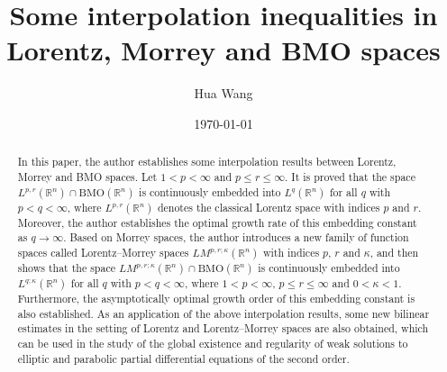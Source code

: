 \documentclass{birkjour}
\theoremstyle{definition}
\theoremstyle{remark}
\numberwithin{equation}{section}
\begin{document}
\title[Some interpolation inequalities]
{Some interpolation inequalities in Lorentz, Morrey and BMO spaces}
\author{Hua Wang}
\address{School of Mathematics and Systems Science,\\
Xinjiang University,\\
Urumqi 830046, P. R. China}




\date{\today}


\begin{abstract}
In this paper, the author establishes some interpolation results between Lorentz, Morrey and BMO spaces. Let $1<p<\infty$ and $p\leq r\leq\infty$. It is proved that the space $L^{p,r}(\mathbb R^n)\cap\mathrm{BMO}(\mathbb R^n)$ is continuously embedded into $L^q(\mathbb R^n)$ for all $q$ with $p<q<\infty$, where $L^{p,r}(\mathbb R^n)$ denotes the classical Lorentz space with indices $p$ and $r$. Moreover, the author establishes the optimal growth rate of this embedding constant as $q\to\infty$. Based on Morrey spaces, the author introduces a new family of function spaces called Lorentz--Morrey spaces $LM^{p,r;\kappa}(\mathbb R^n)$ with indices $p$, $r$ and $\kappa$, and then shows that the space $LM^{p,r;\kappa}(\mathbb R^n)\cap \mathrm{BMO}(\mathbb R^n)$ is continuously embedded into $L^{q;\kappa}(\mathbb R^n)$ for all $q$ with $p<q<\infty$, where $1<p<\infty$, $p\leq r\leq\infty$ and $0<\kappa<1$. Furthermore, the asymptotically optimal growth order of this embedding constant is also established. As an application of the above interpolation results, some new bilinear estimates in the setting of Lorentz and Lorentz--Morrey spaces are also obtained, which can be used in the study of the global existence and regularity of weak solutions to elliptic and parabolic partial differential equations of the second order.
\end{abstract}

\maketitle
\end{document}
